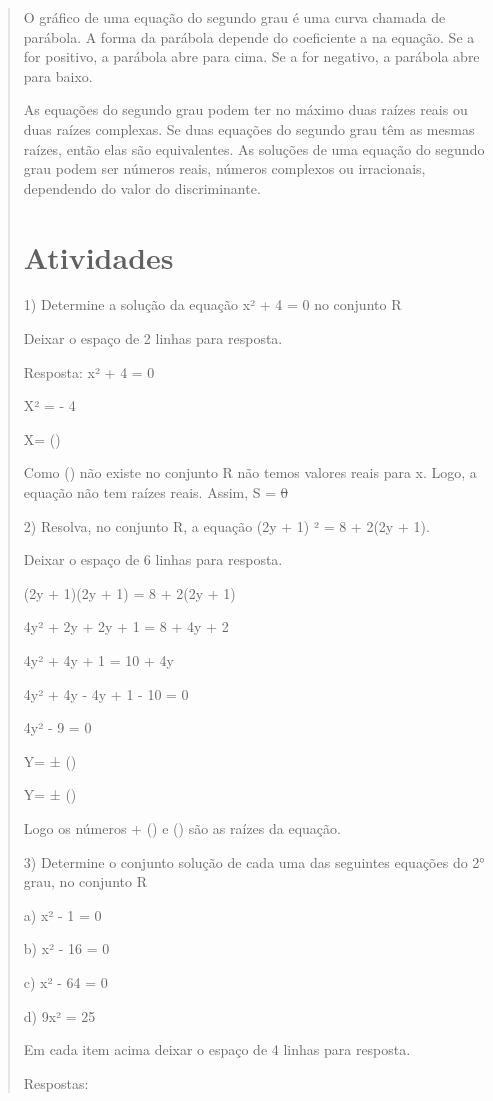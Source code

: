 \begin{quote}
\begin{escolha}
{O gráfico de uma equação do segundo grau é uma curva chamada de parábola. A forma da parábola depende do coeficiente a na equação. Se a for positivo, a parábola abre para cima. Se a for negativo, a parábola abre para baixo.

As equações do segundo grau podem ter no máximo duas raízes reais ou duas raízes complexas. Se duas equações do segundo grau têm as mesmas raízes, então elas são equivalentes. As soluções de uma equação do segundo grau podem ser números reais, números complexos ou irracionais, dependendo do valor do discriminante.}

\section{Atividades}

1) Determine a solução da equação x² + 4 = 0 no conjunto R

Deixar o espaço de 2 linhas para resposta.

Resposta: x² + 4 = 0

X² = - 4

X= ()

Como () não existe no conjunto R não temos valores reais
para x. Logo, a equação não tem raízes reais. Assim, S = \sout{0}

2) Resolva, no conjunto R, a equação (2y + 1) ² = 8 + 2(2y + 1).

Deixar o espaço de 6 linhas para resposta.

(2y + 1)(2y + 1) = 8 + 2(2y + 1)

4y² + 2y + 2y + 1 = 8 + 4y + 2

4y² + 4y + 1 = 10 + 4y

4y² + 4y - 4y + 1 - 10 = 0

4y² - 9 = 0

Y= ± ()

Y= ± ()

Logo os números + () e () são as raízes da
equação.

3) Determine o conjunto solução de cada uma das seguintes equações do 2°
grau, no conjunto R

a) x² - 1 = 0

b) x² - 16 = 0

c) x² - 64 = 0

d) 9x² = 25

Em cada item acima deixar o espaço de 4 linhas para resposta.

Respostas:


\end{escolha}
\end{quote}
